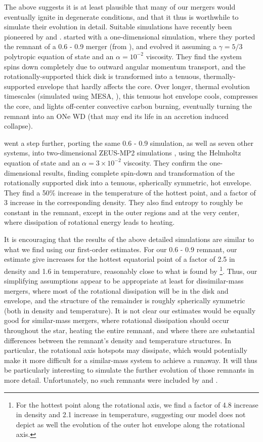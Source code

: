The above suggests it is at least plausible that many of our mergers would eventually ignite in degenerate conditions, and that it thus is worthwhile to simulate their evolution in detail.  Suitable simulations have recently been pioneered by \cite{shen+12} and \cite{schw+12}.  \citeauthor{shen+12} started with a one-dimensional simulation, where they ported the remnant of a 0.6 - 0.9 {\Msun} merger (from \citealt{dan+11}), and evolved it assuming a $\gamma = 5/3$ polytropic equation of state and an $\alpha = 10^{-2}$ viscosity.  They find the system spins down completely due to outward angular momentum transport, and the rotationally-supported thick disk is transformed into a tenuous, thermally-supported envelope that hardly affects the core.  Over longer, thermal evolution timescales (simulated using MESA, \citealt{paxt+11}), this tenuous hot envelope cools, compresses the core, and lights off-center convective carbon burning, eventually turning the remnant into an ONe WD (that may end its life in an accretion induced collapse).

\cite{schw+12} went a step further, porting the same 0.6 - 0.9 {\Msun} simulation, as well as seven other systems, into two-dimensional ZEUS-MP2 simulations \citep{haye+06}, using the Helmholtz equation of state and an $\alpha=3\times10^{-2}$ viscosity.  They confirm the one-dimensional results, finding complete spin-down and transformation of the rotationally supported disk into a tenuous, spherically symmetric, hot envelope.  They find a 50\% increase in the temperature of the hottest point, and a factor of 3 increase in the corresponding density.  They also find entropy to roughly be constant in the remnant, except in the outer regions and at the very center, where dissipation of rotational energy leads to heating.

It is encouraging that the results of the above detailed simulations are similar to what we find using our first-order estimates.  For our 0.6 - 0.9 {\Msun} remnant, our estimate give increases for the hottest equatorial point of a factor of 2.5 in density and 1.6 in temperature, reasonably close to what is found by \citeauthor{schw+12}\footnote{For the hottest point along the rotational axis, we find a factor of 4.8 increase in density and 2.1 increase in temperature, suggesting our model does not depict as well the evolution of the outer hot envelope along the rotational axis.}.  Thus, our simplifying assumptions appear to be appropriate at least for dissimilar-mass mergers, where most of the rotational dissipation will be in the disk and envelope, and the structure of the remainder is roughly spherically symmetric (both in density and temperature).  It is not clear our estimates would be equally good for similar-mass mergers, where rotational dissipation should occur throughout the star, heating the entire remnant, and where there are substantial differences between the remnant's density and temperature structures.  In particular, the rotational axis hotspots may dissipate, which would potentially make it more difficult for a similar-mass system to achieve a runaway.  It will thus be particularly interesting to simulate the further evolution of those remnants in more detail.  Unfortunately, no such remnants were included by \citeauthor{shen+12} and \citeauthor{schw+12}.

